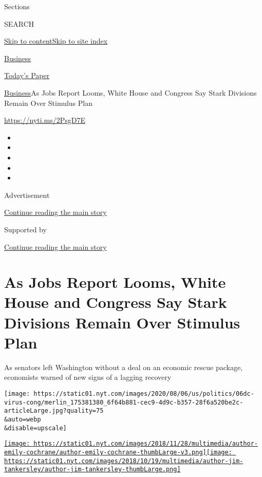 Sections

SEARCH

\protect\hyperlink{site-content}{Skip to
content}\protect\hyperlink{site-index}{Skip to site index}

\href{https://www.nytimes.com/section/business}{Business}

\href{https://myaccount.nytimes.com/auth/login?response_type=cookie\&client_id=vi}{}

\href{https://www.nytimes.com/section/todayspaper}{Today's Paper}

\href{/section/business}{Business}\textbar{}As Jobs Report Looms, White
House and Congress Say Stark Divisions Remain Over Stimulus Plan

\href{https://nyti.ms/2PsgD7E}{https://nyti.ms/2PsgD7E}

\begin{itemize}
\item
\item
\item
\item
\item
\end{itemize}

Advertisement

\protect\hyperlink{after-top}{Continue reading the main story}

Supported by

\protect\hyperlink{after-sponsor}{Continue reading the main story}

\hypertarget{as-jobs-report-looms-white-house-and-congress-say-stark-divisions-remain-over-stimulus-plan}{%
\section{As Jobs Report Looms, White House and Congress Say Stark
Divisions Remain Over Stimulus
Plan}\label{as-jobs-report-looms-white-house-and-congress-say-stark-divisions-remain-over-stimulus-plan}}

As senators left Washington without a deal on an economic rescue
package, economists warned of new signs of a lagging recovery

\texttt{[image: https://static01.nyt.com/images/2020/08/06/us/politics/06dc-virus-cong/merlin\_175381380\_6f64b881-cec9-4d9c-b357-28f6a520be2c-articleLarge.jpg?quality=75\\\&auto=webp\\\&disable=upscale]}

\href{https://www.nytimes.com/by/emily-cochrane}{\texttt{[image: https://static01.nyt.com/images/2018/11/28/multimedia/author-emily-cochrane/author-emily-cochrane-thumbLarge-v3.png]}}\href{https://www.nytimes.com/by/jim-tankersley}{\texttt{[image: https://static01.nyt.com/images/2018/10/19/multimedia/author-jim-tankersley/author-jim-tankersley-thumbLarge.png]}}

